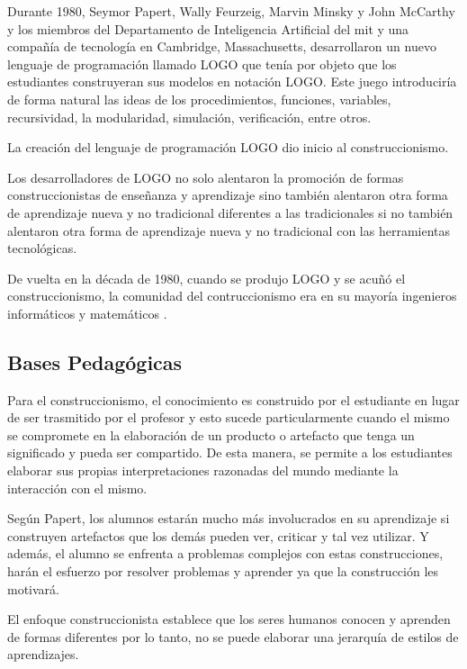Durante 1980, Seymor Papert, Wally Feurzeig, Marvin Minsky y John McCarthy y los
miembros del Departamento de Inteligencia Artificial del \Gls{mit} y una
compañía de tecnología en Cambridge, Massachusetts, desarrollaron un nuevo
lenguaje de programación llamado LOGO que tenía por objeto que los estudiantes
construyeran sus modelos en notación LOGO\@. Este juego introduciría de forma
natural las ideas de los procedimientos, funciones, variables, recursividad, la
modularidad, simulación, verificación, entre otros.

La creación del lenguaje de programación LOGO dio inicio al construccionismo.

Los desarrolladores de LOGO no solo alentaron la promoción
de formas construccionistas de enseñanza y aprendizaje sino también alentaron otra
forma de aprendizaje nueva y no tradicional diferentes a las 
tradicionales si no también alentaron otra forma de aprendizaje nueva y no tradicional
con las herramientas tecnológicas. 

De vuelta en la década de 1980, cuando se produjo LOGO y se acuñó el construccionismo, 
la comunidad del contruccionismo era en su mayoría  ingenieros informáticos y matemáticos
\cite{historia:2014}.

\subsection{Bases Pedagógicas}

Para el construccionismo, el conocimiento es construido por el estudiante en
lugar de ser trasmitido por el profesor\cite{moses:2003} y esto sucede
particularmente cuando el mismo se compromete en la elaboración de un producto o
artefacto que tenga un significado y pueda ser compartido\cite{valdivia:sg}. De
esta manera, se permite a los estudiantes elaborar sus propias interpretaciones
razonadas del mundo mediante la interacción con el mismo.

Según Papert, los alumnos estarán mucho más involucrados en su aprendizaje si
construyen artefactos que los demás pueden ver, criticar y tal vez utilizar. Y
además, el alumno se enfrenta a problemas complejos con estas construcciones,
harán el esfuerzo por resolver problemas y aprender ya que la construcción les
motivará\cite{const:vs}.

El enfoque construccionista establece que los seres humanos conocen y aprenden
de formas diferentes por lo tanto, no se puede elaborar una jerarquía de estilos
de aprendizajes\cite{valdivia:sg}.

